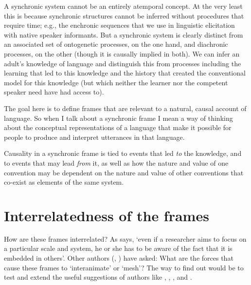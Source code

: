 A synchronic system cannot be an entirely atemporal concept. At the very 
least this is because synchronic structures cannot be inferred without 
procedures that require time; e.g., the enchronic sequences that we use
in linguistic elicitation with native speaker informants. But a synchronic system is 
clearly distinct from an associated set of ontogenetic processes, on the one hand, 
and diachronic processes, on the other (though it is causally 
implied in both). We can infer an adult's knowledge of language and 
distinguish this from processes including the learning that led to this 
knowledge and the history that created the conventional model for 
this knowledge (but which neither the learner nor the competent speaker 
need have had access to). 



The goal here is to define frames that are relevant to a natural, causal account of language. So when I talk about a 
synchronic frame I mean a way of thinking about the conceptual representations of a language that make it possible for people to produce and interpret utterances in that language. 



Causality in a synchronic frame is tied to events that led \textit{to} 
the knowledge, and to events that may lead \textit{from} it, as well as how the 
nature and value of one convention may be dependent on the nature and 
value of other conventions that co-exist as elements of the same system.



\section{Interrelatedness of the frames}



How are these frames interrelated? As \citet[276]{raczaszek-leonardi_multiple_2010} says, \textquoteleft even if a researcher aims to focus on a particular scale and system, he 
or she has to be aware of the fact that it is embedded in others'. Other 
authors (\citealt[179]{cole_cultural_1996}, \citealt[192]{macwhinney_emergence_2005}) have asked: What are the 
forces that cause these frames to \textquoteleft interanimate' or \textquoteleft mesh'? The way to find out would be to test and extend the useful suggestions of authors like \citet{newell_unified_1990}, \citet[184-5]{cole_cultural_1996}, \citet{macwhinney_emergence_2005}, \citet[279ff]{lemke_across_2000} and \citet{uryu_ecology_2014}. 



